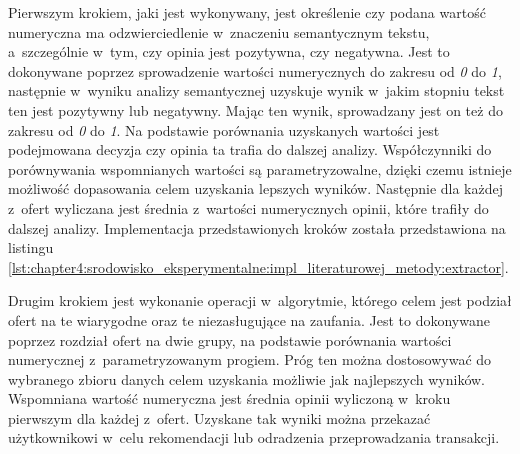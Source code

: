 \documentclass[../Kamil_Kowalewski_Main.tex]{subfiles}
\begin{document}
{{        Pierwszym krokiem, jaki jest wykonywany, jest określenie czy podana wartość
        numeryczna ma odzwierciedlenie w~znaczeniu semantycznym tekstu, a~szczególnie
        w~tym, czy opinia jest pozytywna, czy negatywna. Jest to dokonywane poprzez
        sprowadzenie wartości numerycznych do zakresu od \textit{0} do \textit{1},
        następnie w~wyniku analizy semantycznej uzyskuje wynik w~jakim stopniu tekst
        ten jest pozytywny lub negatywny. Mając ten wynik, sprowadzany jest on też do
        zakresu od \textit{0} do \textit{1}. Na podstawie porównania uzyskanych
        wartości jest podejmowana decyzja czy opinia ta trafia do dalszej analizy.
        Współczynniki do porównywania wspomnianych wartości są parametryzowalne, dzięki
        czemu istnieje możliwość dopasowania celem uzyskania lepszych wyników.
        Następnie dla każdej z~ofert wyliczana jest średnia z~wartości numerycznych
        opinii, które trafiły do dalszej analizy. Implementacja przedstawionych kroków
        została przedstawiona na listingu
        \ref{lst:chapter4:srodowisko_eksperymentalne:impl_literaturowej_metody:extractor}.

        Drugim krokiem jest wykonanie operacji w~algorytmie, którego celem jest podział
        ofert na te wiarygodne oraz te niezasługujące na zaufania. Jest to dokonywane
        poprzez rozdział ofert na dwie grupy, na podstawie porównania wartości
        numerycznej z~parametryzowanym progiem. Próg ten można dostosowywać do
        wybranego zbioru danych celem uzyskania możliwie jak najlepszych wyników.
        Wspomniana wartość numeryczna jest średnia opinii wyliczoną w~kroku pierwszym
        dla każdej z~ofert. Uzyskane tak wyniki można przekazać użytkownikowi w~celu
        rekomendacji lub odradzenia przeprowadzania transakcji.



}}
\end{document}
